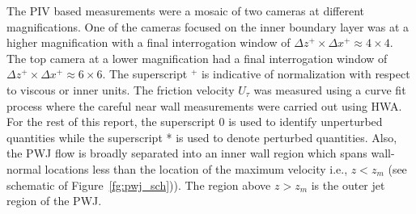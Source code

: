 The PIV based measurements were a mosaic of two cameras at different magnifications. One of the cameras focused on the inner boundary layer was at a higher magnification with a final interrogation window of $\Delta z^+ \times \Delta x^+ \approx 4 \times 4$. The top camera at a lower magnification had a final interrogation window of $\Delta z^+ \times \Delta x^+ \approx 6 \times 6$. The superscript $^+$ is indicative of normalization with respect to viscous or inner units. The friction velocity $U_\tau$ was measured using a curve fit process where the careful near wall measurements were carried out using HWA. For the rest of this report, the superscript 0 is used to identify unperturbed quantities while the superscript * is used to denote perturbed quantities.  Also, the PWJ flow is broadly separated into an inner wall region which spans wall-normal locations less than the location of the maximum velocity i.e., $z<z_m$ (see schematic of Figure~\ref{fg:pwj_sch})). The region above $z>z_m$ is the outer jet region of the PWJ.
